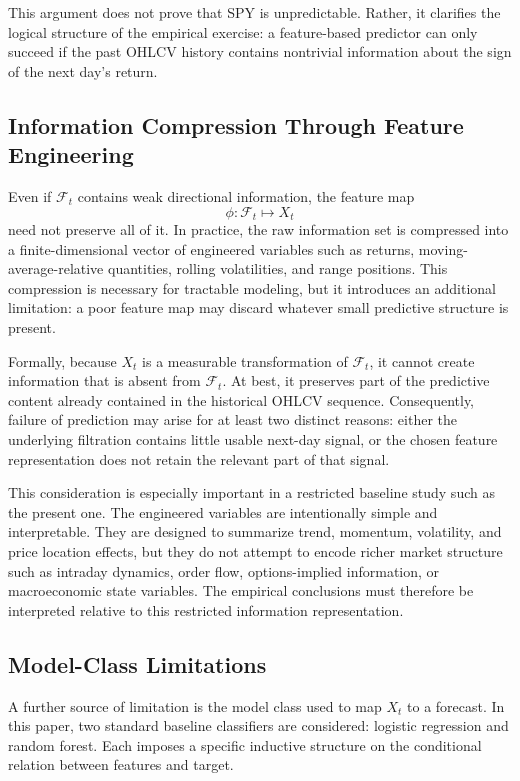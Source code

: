 \documentclass[11pt,a4paper]{article}
\begin{document}
	This argument does not prove that SPY is unpredictable. Rather, it clarifies the logical structure of the empirical exercise: a feature-based predictor can only succeed if the past OHLCV history contains nontrivial information about the sign of the next day's return.
	
	\subsection{Information Compression Through Feature Engineering}
	
	Even if \(\mathcal{F}_t\) contains weak directional information, the feature map
	\[
	\phi : \mathcal{F}_t \mapsto X_t
	\]
	need not preserve all of it. In practice, the raw information set is compressed into a finite-dimensional vector of engineered variables such as returns, moving-average-relative quantities, rolling volatilities, and range positions. This compression is necessary for tractable modeling, but it introduces an additional limitation: a poor feature map may discard whatever small predictive structure is present.
	
	Formally, because \(X_t\) is a measurable transformation of \(\mathcal{F}_t\), it cannot create information that is absent from \(\mathcal{F}_t\). At best, it preserves part of the predictive content already contained in the historical OHLCV sequence. Consequently, failure of prediction may arise for at least two distinct reasons: either the underlying filtration contains little usable next-day signal, or the chosen feature representation does not retain the relevant part of that signal.
	
	This consideration is especially important in a restricted baseline study such as the present one. The engineered variables are intentionally simple and interpretable. They are designed to summarize trend, momentum, volatility, and price location effects, but they do not attempt to encode richer market structure such as intraday dynamics, order flow, options-implied information, or macroeconomic state variables. The empirical conclusions must therefore be interpreted relative to this restricted information representation.
	
	\subsection{Model-Class Limitations}
	
	A further source of limitation is the model class used to map \(X_t\) to a forecast. In this paper, two standard baseline classifiers are considered: logistic regression and random forest. Each imposes a specific inductive structure on the conditional relation between features and target.
	
\end{document}
